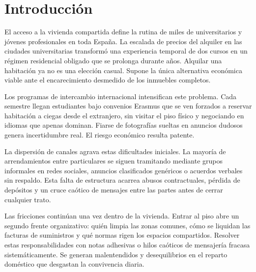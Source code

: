 
\chapter {Introducción}
\label{sec:intro}


    El acceso a la vivienda compartida define la rutina de miles de universitarios y jóvenes profesionales en toda España. La escalada de precios del alquiler en las ciudades universitarias transformó una experiencia temporal de dos cursos en un régimen residencial obligado que se prolonga durante años. Alquilar una habitación ya no es una elección casual. Supone la única alternativa económica viable ante el encarecimiento desmedido de los inmuebles completos.

    Los programas de intercambio internacional intensifican este problema. Cada semestre llegan estudiantes bajo convenios Erasmus que se ven forzados a reservar habitación a ciegas desde el extranjero, sin visitar el piso físico y negociando en idiomas que apenas dominan. Fiarse de fotografías sueltas en anuncios dudosos genera incertidumbre real. El riesgo económico resulta patente.

    La dispersión de canales agrava estas dificultades iniciales. La mayoría de arrendamientos entre particulares se siguen tramitando mediante grupos informales en redes sociales, anuncios clasificados genéricos o acuerdos verbales sin respaldo. Esta falta de estructura acarrea abusos contractuales, pérdida de depósitos y un cruce caótico de mensajes entre las partes antes de cerrar cualquier trato.

    Las fricciones continúan una vez dentro de la vivienda. Entrar al piso abre un segundo frente organizativo: quién limpia las zonas comunes, cómo se liquidan las facturas de suministros y qué normas rigen los espacios compartidos. Resolver estas responsabilidades con notas adhesivas o hilos caóticos de mensajería fracasa sistemáticamente. Se generan malentendidos y desequilibrios en el reparto doméstico que desgastan la convivencia diaria.

    









